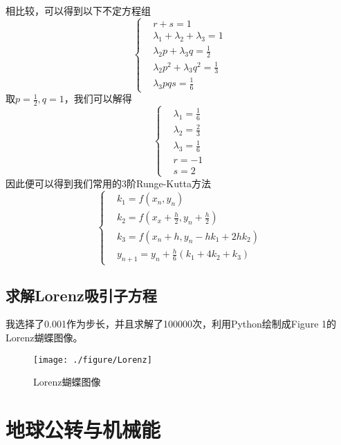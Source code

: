 \documentclass[twoside,twocolumn]{article}
\begin{document}
\begin{CJK*}{UTF8}{gkai}
\begin{equation*}
\end{equation*}
相比较，可以得到以下不定方程组
\begin{equation*}
	\left\{
	\begin{aligned}
		&r+s=1\\
		&\lambda_{1}+\lambda_{2}+\lambda_{3}=1\\
		&\lambda_{2}p+\lambda_{3}q=\frac{1}{2}\\
		&\lambda_{2}p^{2}+\lambda_{3}q^{2}=\frac{1}{3}\\
		&\lambda_{3}pqs=\frac{1}{6}
	\end{aligned}
	\right.	
\end{equation*}
取$p=\frac{1}{2},q=1$，我们可以解得
\begin{equation*}
	\left\{
	\begin{aligned}
		&\lambda_{1}=\frac{1}{6}\\
		&\lambda_{2}=\frac{2}{3}\\
		&\lambda_{3}=\frac{1}{6}\\
		&r=-1\\
		&s=2
	\end{aligned}
	\right.
\end{equation*}
因此便可以得到我们常用的3阶Runge-Kutta方法
\begin{equation*}
	\left\{
	\begin{aligned}
		&k_{1}=f(x_{n},y_{n})\\
		&k_{2}=f(x_{x}+\frac{h}{2},y_{n}+\frac{h}{2})\\
		&k_{3}=f(x_{n}+h,y_{n}-hk_{1}+2hk_{2})\\
		&y_{n+1}=y_{n}+\frac{h}{6}(k_{1}+4k_{2}+k_{3})
	\end{aligned}
	\right.
\end{equation*}
\subsection{求解Lorenz吸引子方程}
我选择了0.001作为步长，并且求解了100000次，利用Python绘制成Figure 1的Lorenz蝴蝶图像。
\begin{figure}[h]
	\centering
	\texttt{[image: ./figure/Lorenz]}
	\caption{Lorenz蝴蝶图像}
	\label{fig:Lorenz}
\end{figure}


\section{地球公转与机械能}

\end{CJK*}
\end{document}

